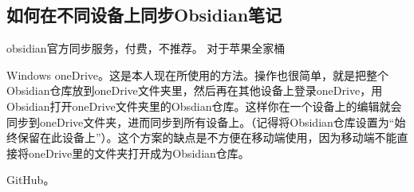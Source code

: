   \subsection{如何在不同设备上同步Obsidian笔记}
  obsidian官方同步服务，付费，不推荐。
  对于苹果全家桶

  Windows oneDrive。这是本人现在所使用的方法。操作也很简单，就是把整个Obsidian仓库放到oneDrive文件夹里，然后再在其他设备上登录oneDrive，用Obsidian打开oneDrive文件夹里的Obsdian仓库。这样你在一个设备上的编辑就会同步到oneDrive文件夹，进而同步到所有设备上。（记得将Obsidian仓库设置为“始终保留在此设备上”）。这个方案的缺点是不方便在移动端使用，因为移动端不能直接将oneDrive里的文件夹打开成为Obsidian仓库。

  GitHub。
